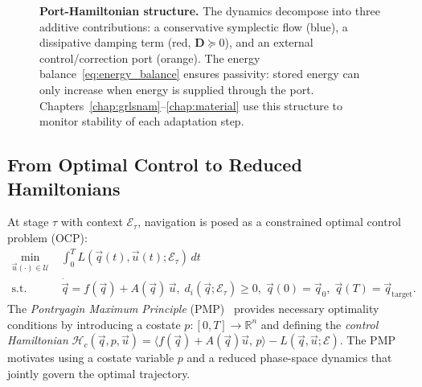 \begin{figure}[t]
\caption{%
  \textbf{Port-Hamiltonian structure.}
  The dynamics decompose into three additive contributions:
  a conservative symplectic flow (blue),
  a dissipative damping term (red, $\mathbf{D}\succeq 0$),
  and an external control/correction port (orange).
  The energy balance~\eqref{eq:energy_balance} ensures passivity:
  stored energy can only increase when energy is supplied through the port.
  Chapters~\ref{chap:grlsnam}--\ref{chap:material} use this structure to
  monitor stability of each adaptation step.
}
\label{fig:prelim:portham}
\end{figure}

\subsection{From Optimal Control to Reduced Hamiltonians}
\label{subsec:prelim:pmp}

At stage $\tau$ with context $\mathcal{E}_\tau$, navigation is posed as a
constrained optimal control problem (OCP):
\begin{equation}
\label{eq:ocp_prelim}
\begin{aligned}
\min_{\vec{u}(\cdot)\in\mathcal{U}}\;
&\int_0^T L(\vec{q}(t),\vec{u}(t);\mathcal{E}_\tau)\,dt \\
\text{s.t.}\quad
&\dot{\vec{q}} = f(\vec{q}) + A(\vec{q})\,\vec{u},\;
d_i(\vec{q};\mathcal{E}_\tau)\geq 0,\;
\vec{q}(0)=\vec{q}_0,\;\vec{q}(T)=\vec{q}_{\mathrm{target}}.
\end{aligned}
\end{equation}
The \emph{Pontryagin Maximum Principle} (PMP)~\citep{
FERREIRA1994whenpmp,hartl1995survey} provides necessary optimality conditions
by introducing a costate $p : [0,T]\to\mathbb{R}^n$ and defining the
\emph{control Hamiltonian}
$\mathcal{H}_c(\vec{q},p,\vec{u}) = \langle f(\vec{q})+A(\vec{q})\vec{u},\,p\rangle
- L(\vec{q},\vec{u};\mathcal{E})$.
The PMP motivates using a costate variable $p$ and a reduced phase-space
dynamics that jointly govern the optimal trajectory.

